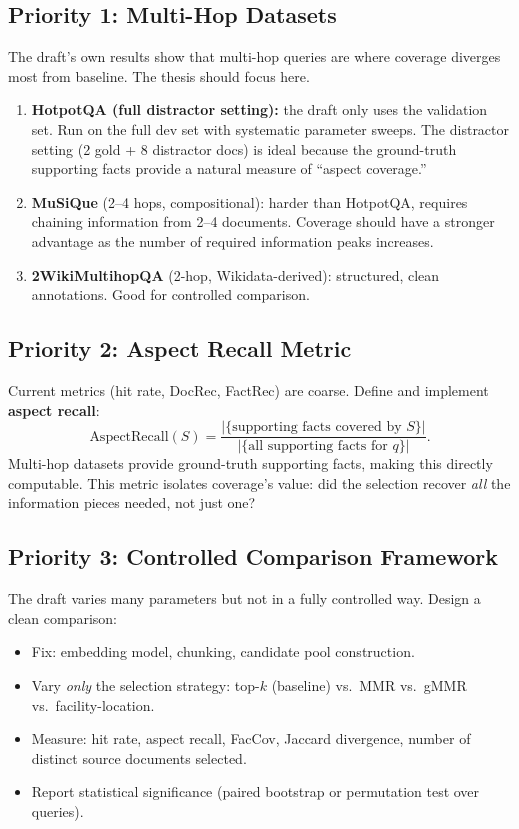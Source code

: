 \documentclass[11pt,a4paper]{article}
\begin{document}
\subsection{Priority 1: Multi-Hop Datasets}

The draft's own results show that multi-hop queries are where coverage diverges most from baseline. The thesis should focus here.

\begin{enumerate}[leftmargin=*]
	\item \textbf{HotpotQA (full distractor setting):} the draft only uses the validation set. Run on the full dev set with systematic parameter sweeps. The distractor setting (2 gold + 8 distractor docs) is ideal because the ground-truth supporting facts provide a natural measure of ``aspect coverage.''
	\item \textbf{MuSiQue} (2--4 hops, compositional): harder than HotpotQA, requires chaining information from 2--4 documents. Coverage should have a stronger advantage as the number of required information peaks increases.
	\item \textbf{2WikiMultihopQA} (2-hop, Wikidata-derived): structured, clean annotations. Good for controlled comparison.
\end{enumerate}

\subsection{Priority 2: Aspect Recall Metric}

Current metrics (hit rate, DocRec, FactRec) are coarse. Define and implement \textbf{aspect recall}:
\[
	\text{AspectRecall}(S) = \frac{|\{\text{supporting facts covered by } S\}|}{|\{\text{all supporting facts for } q\}|}.
\]
Multi-hop datasets provide ground-truth supporting facts, making this directly computable. This metric isolates coverage's value: did the selection recover \emph{all} the information pieces needed, not just one?

\subsection{Priority 3: Controlled Comparison Framework}

The draft varies many parameters but not in a fully controlled way. Design a clean comparison:
\begin{itemize}[leftmargin=*]
	\item Fix: embedding model, chunking, candidate pool construction.
	\item Vary \emph{only} the selection strategy: top-$k$ (baseline) vs.\ MMR vs.\ gMMR vs.\ facility-location.
	\item Measure: hit rate, aspect recall, FacCov, Jaccard divergence, number of distinct source documents selected.
	\item Report statistical significance (paired bootstrap or permutation test over queries).
\end{itemize}
\end{document}
